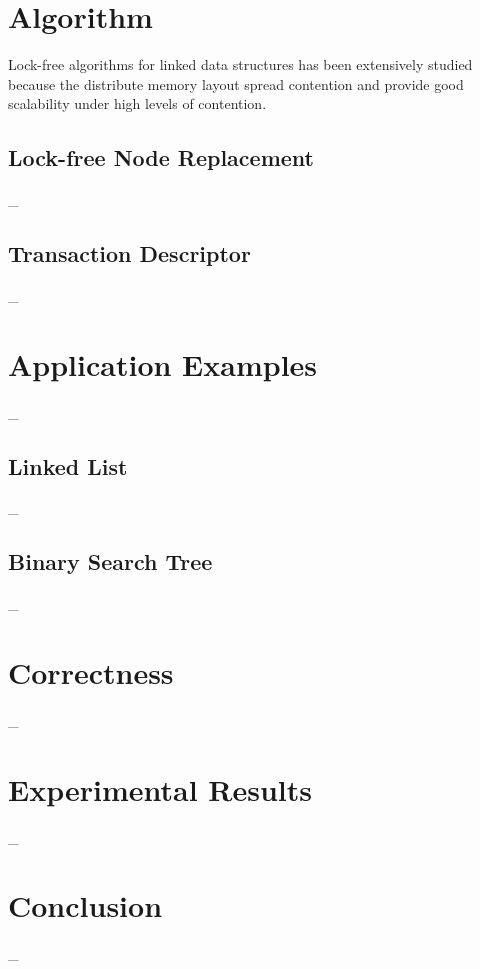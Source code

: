 \documentclass[10pt,conference,compsocconf]{IEEEtran}
\begin{document}
\section{Algorithm}
\label{sec:algorithm}
Lock-free algorithms for linked data structures has been extensively studied because the distribute memory layout spread contention and provide good scalability under high levels of contention.

\subsection{Lock-free Node Replacement}
\label{sec:noderepl}
\_


\subsection{Transaction Descriptor}
\label{sec:txndesc}
\_

\section{Application Examples}
\label{sec:application}
\_

\subsection{Linked List}
\_

\subsection{Binary Search Tree}
\_

\section{Correctness}
\label{sec:correctness}
\_

\section{Experimental Results}
\label{sec:experiment}
\_

\section{Conclusion}
\label{sec:conclusion}
\_




\end{document}
